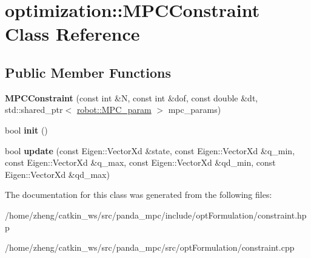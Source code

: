 \hypertarget{classoptimization_1_1_m_p_c_constraint}{}\section{optimization\+:\+:M\+P\+C\+Constraint Class Reference}
\label{classoptimization_1_1_m_p_c_constraint}
\subsection*{Public Member Functions}
\begin{DoxyCompactItemize}
\item 
\mbox{\label{classoptimization_1_1_m_p_c_constraint_a2aa347c50f988dad27502536e105be79}} 
{\bfseries M\+P\+C\+Constraint} (const int \&N, const int \&dof, const double \&dt, std\+::shared\+\_\+ptr$<$ \hyperlink{structrobot_1_1_m_p_c__param}{robot\+::\+M\+P\+C\+\_\+param} $>$ mpc\+\_\+params)
\item 
\mbox{\label{classoptimization_1_1_m_p_c_constraint_a8c9ada6c91c83bf13af7a49c45b1321b}} 
bool {\bfseries init} ()
\item 
\mbox{\label{classoptimization_1_1_m_p_c_constraint_a2c349e726f6c8b83aa20d37f58dae6d1}} 
bool {\bfseries update} (const Eigen\+::\+Vector\+Xd \&state, const Eigen\+::\+Vector\+Xd \&q\+\_\+min, const Eigen\+::\+Vector\+Xd \&q\+\_\+max, const Eigen\+::\+Vector\+Xd \&qd\+\_\+min, const Eigen\+::\+Vector\+Xd \&qd\+\_\+max)
\end{DoxyCompactItemize}


The documentation for this class was generated from the following files\+:\begin{DoxyCompactItemize}
\item 
/home/zheng/catkin\+\_\+ws/src/panda\+\_\+mpc/include/opt\+Formulation/constraint.\+hpp\item 
/home/zheng/catkin\+\_\+ws/src/panda\+\_\+mpc/src/opt\+Formulation/constraint.\+cpp\end{DoxyCompactItemize}

